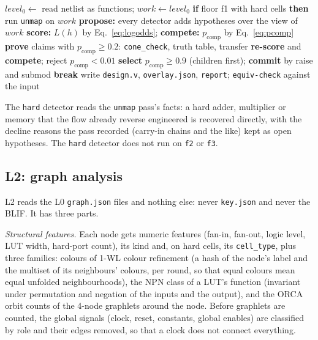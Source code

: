 \documentclass[conference]{IEEEtran}
\newcommand{\code}[1]{\texttt{#1}}
\begin{document}
\begin{algorithm}[t]
\caption{The L1 round loop (\code{loki/re/loop.py}).}
\label{alg:l1}
\begin{algorithmic}[1]
\small
\STATE $\mathit{level}_0\gets$ read netlist as functions; $\mathit{work}\gets\mathit{level}_0$
\STATE \textbf{if} floor f1 with hard cells \textbf{then} run \code{unmap} on $\mathit{work}$
\STATE \textbf{propose:} every detector adds hypotheses over the view of $\mathit{work}$
\STATE \textbf{score:} $L(h)$ by Eq.~\ref{eq:logodds}; \textbf{compete:} $p_{\mathrm{comp}}$ by Eq.~\ref{eq:pcomp}
\STATE \textbf{prove} claims with $p_{\mathrm{comp}}\ge 0.2$: \code{cone\_check}, truth table, transfer
\STATE \textbf{re-score} and \textbf{compete}; reject $p_{\mathrm{comp}}<0.01$
\STATE \textbf{select} $p_{\mathrm{comp}}\ge 0.9$ (children first); \textbf{commit} by raise and submod
 \STATE \textbf{break} \ENDIF
\ENDFOR
\STATE write \code{design.v}, \code{overlay.json}, \code{report}; \code{equiv-check} against the input
\end{algorithmic}
\end{algorithm}

The \code{hard} detector reads the \code{unmap} pass's facts: a hard adder, multiplier
or memory that the flow already reverse engineered is recovered directly, with the
decline reasons the pass recorded (carry-in chains and the like) kept as open hypotheses. The
\code{hard} detector does not run on \code{f2} or \code{f3}.

\subsection{L2: graph analysis}
\label{sec:l2}

L2 reads the L0 \code{graph.json} files and nothing else: never \code{key.json} and never the
BLIF. It has three parts.

\emph{Structural features.} Each node gets numeric features (fan-in, fan-out, logic level,
LUT width, hard-port count), its kind and, on hard cells, its \code{cell\_type}, plus three
families: colours of 1-WL colour refinement (a hash of the node's label and the multiset of
its neighbours' colours, per round, so that equal colours mean equal unfolded neighbourhoods),
the NPN class of a LUT's function (invariant under permutation and negation of the inputs and the output), and the
ORCA orbit counts of the 4-node graphlets around the node. Before graphlets are counted, the
global signals (clock, reset, constants, global enables) are classified by role and their
edges removed, so that a clock does not connect everything.
\end{document}
